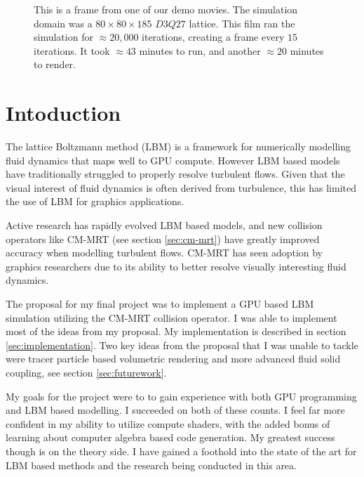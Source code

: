 \begin{figure*}
\begin{center}
\end{center}
\caption{This is a frame from one of our demo movies.
  The simulation domain was a $80 \times 80 \times 185$ 
  $D3Q27$ lattice. 
  This film ran the simulation for $\approx 20,000$ iterations,
  creating a frame every $15$ iterations.
It took $\approx 43$ minutes to run, and another $\approx 20$ minutes to render.}
\label{fig:movie-frame}
\end{figure*}

\section{Intoduction}

The lattice Boltzmann method (LBM) 
is a framework for numerically modelling fluid dynamics
that maps well to GPU compute.
However LBM based models have traditionally struggled to 
properly resolve turbulent flows.
Given that the visual interest of fluid dynamics is often 
derived from turbulence, this has limited the use of LBM 
for graphics applications.

Active research has rapidly evolved LBM based models,
and new collision operators like CM-MRT (see section \ref{sec:cm-mrt})
have greatly improved accuracy when modelling turbulent flows.
CM-MRT has seen adoption by graphics 
researchers \cite{Li2020, Li2024, Lyu2021} due
to its ability to better resolve visually interesting
fluid dynamics.

The proposal for my final project was to
implement a GPU based LBM simulation utilizing the CM-MRT collision 
operator.
I was able to implement most of the ideas from
my proposal.
My implementation is described in section 
\ref{sec:implementation}.
Two key ideas from the proposal that I was unable to tackle
were tracer particle based volumetric rendering
and more advanced fluid solid coupling, see section \ref{sec:futurework}.

My goals for the project were to to gain experience with both GPU programming and 
LBM based modelling.
I succeeded on both of these counts.
I feel far more confident in my ability to utilize compute shaders,
with the added bonus of learning about computer algebra based
code generation.
My greatest success though is on the theory side.
I have gained a foothold into
the state of the art for LBM based methods and
the research being conducted in this area.
